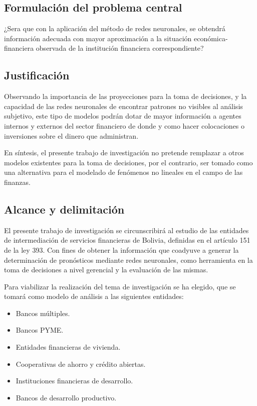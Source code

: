 \documentclass[
  12pt,
]{article}
\providecommand{\tightlist}{%
  \setlength{\itemsep}{0pt}\setlength{\parskip}{0pt}}
\begin{document}
\hypertarget{formulaciuxf3n-del-problema-central}{%
\subsection{Formulación del problema
central}\label{formulaciuxf3n-del-problema-central}}

¿Sera que con la aplicación del método de redes neuronales, se obtendrá
información adecuada con mayor aproximación a la situación
económica-financiera observada de la institución financiera
correspondiente?

\hypertarget{justificaciuxf3n}{%
\subsection{Justificación}\label{justificaciuxf3n}}

Observando la importancia de las proyecciones para la toma de
decisiones, y la capacidad de las redes neuronales de encontrar patrones
no visibles al análisis subjetivo, este tipo de modelos podrán dotar de
mayor información a agentes internos y externos del sector financiero de
donde y como hacer colocaciones o inversiones sobre el dinero que
administran.

En síntesis, el presente trabajo de investigación no pretende remplazar
a otros modelos existentes para la toma de decisiones, por el contrario,
ser tomado como una alternativa para el modelado de fenómenos no
lineales en el campo de las finanzas.

\hypertarget{alcance-y-delimitaciuxf3n}{%
\subsection{Alcance y delimitación}\label{alcance-y-delimitaciuxf3n}}

El presente trabajo de investigación se circunscribirá al estudio de las
entidades de intermediación de servicios financieras de Bolivia,
definidas en el artículo 151 de la ley 393. Con fines de obtener la
información que coadyuve a generar la determinación de pronósticos
mediante redes neuronales, como herramienta en la toma de decisiones a
nivel gerencial y la evaluación de las mismas.

Para viabilizar la realización del tema de investigación se ha elegido,
que se tomará como modelo de análisis a las siguientes entidades:

\begin{itemize}
\tightlist
\item
  Bancos múltiples.
\item
  Bancos PYME.
\item
  Entidades financieras de vivienda.
\item
  Cooperativas de ahorro y crédito abiertas.
\item
  Instituciones financieras de desarrollo.
\item
  Bancos de desarrollo productivo.
\end{itemize}
\end{document}
